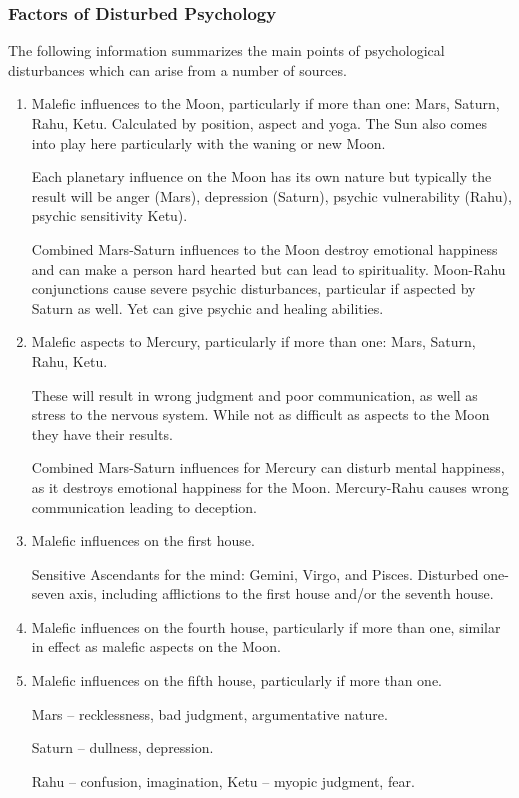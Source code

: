 \subsubsection{Factors of Disturbed Psychology}
 

The following information summarizes the main points of psychological disturbances which can arise from a number of sources.

\begin{enumerate}

\item Malefic influences to the Moon, particularly if more than one: Mars, Saturn, Rahu, Ketu. Calculated by position, aspect and yoga. The Sun also comes into play here particularly with the waning or new Moon.

 

Each planetary influence on the Moon  has its own nature but typically the result will be anger (Mars), depression (Saturn), psychic vulnerability (Rahu), psychic sensitivity Ketu).

 

Combined Mars-Saturn influences to the Moon destroy emotional happiness and can make a person hard hearted but can lead to spirituality. Moon-Rahu conjunctions cause severe psychic disturbances, particular if aspected by Saturn as well. Yet can give psychic and healing abilities.

 

\item Malefic aspects to Mercury, particularly if more than one: Mars, Saturn, Rahu, Ketu.

 

These will result in wrong judgment and poor communication, as well as stress to the nervous system. While not as difficult as aspects to the Moon they have their results.

 

Combined Mars-Saturn influences for Mercury can disturb mental happiness, as it destroys emotional happiness for the Moon. Mercury-Rahu causes wrong communication leading to deception.

 

\item Malefic influences on the first house.

Sensitive Ascendants for the mind: Gemini, Virgo, and Pisces. Disturbed one-seven axis, including afflictions to the first house and/or the seventh house.

 

\item Malefic influences on the fourth house, particularly if more than one, similar in effect as malefic aspects on the Moon.

 

\item Malefic influences on the fifth house, particularly if more than one.

Mars – recklessness, bad judgment, argumentative nature.

Saturn – dullness, depression.

Rahu – confusion, imagination, Ketu – myopic judgment, fear.

\end{enumerate} 

